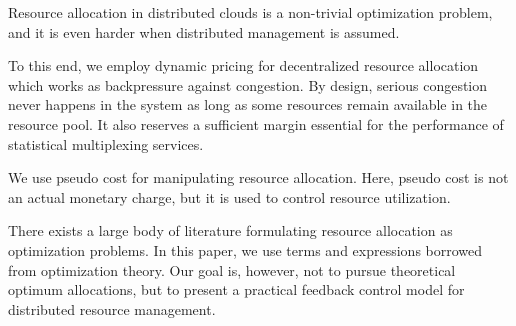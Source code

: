 Resource allocation in distributed clouds is a non-trivial
optimization problem, and it is even harder when distributed
management is assumed.

To this end, we employ dynamic pricing for decentralized resource
allocation which works as backpressure against congestion.
By design, serious congestion never happens in the system as long as
some resources remain available in the resource pool.
It also reserves a sufficient margin essential for the performance of
statistical multiplexing services.

We use pseudo cost for manipulating resource allocation.
Here, pseudo cost is not an actual monetary charge, but it is used to
control resource utilization.

There exists a large body of literature formulating resource allocation
as optimization problems.
In this paper, we use terms and expressions borrowed from optimization
theory. Our goal is, however, not to pursue theoretical optimum
allocations, but to present a practical feedback control model for
distributed resource management.


